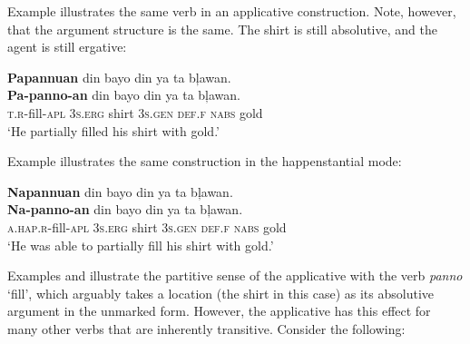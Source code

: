 Example  illustrates the same verb in an applicative construction. Note, however, that the argument structure is the same. The shirt is still absolutive, and the agent is still ergative:

\ea
\label{bkm:Ref395171874}
\textbf{Papannuan}  din  bayo  din  ya  ta  bļawan. \\\smallskip
\gll \textbf{Pa-panno-an}  din  bayo  din  ya  ta  bļawan. \\
\textsc{t.r}-fill-\textsc{apl}  3\textsc{s.erg}  shirt  3\textsc{s.gen}  \textsc{def.f}  \textsc{nabs}  gold \\
\glt ‘He partially filled his shirt with gold.’
\z

Example  illustrates the same construction in the happenstantial mode:

\ea
\label{bkm:Ref395206755}
\textbf{Napannuan}  din  bayo  din  ya  ta  bļawan. \\\smallskip
\gll \textbf{Na-panno-an}  din  bayo  din  ya  ta  bļawan. \\
\textsc{a}.\textsc{hap.r}-fill-\textsc{apl}  3\textsc{s.erg}  shirt  3\textsc{s.gen}  \textsc{def.f}  \textsc{nabs}  gold \\
\glt ‘He was able to partially fill his shirt with gold.’
\z

Examples  and  illustrate the partitive sense of the applicative with the verb \textit{panno} ‘fill’, which arguably takes a location (the shirt in this case) as its absolutive argument in the unmarked form. However, the applicative has this effect for many other verbs that are inherently transitive. Consider the following:

